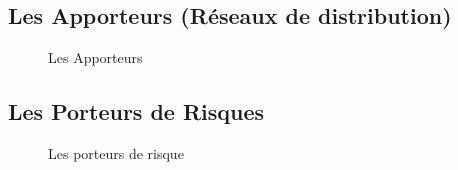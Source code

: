     \subsection{Les Apporteurs (Réseaux de distribution)}
    \begin{figure}[H]
\centering
{}
\caption{Les Apporteurs}
\label{fig:Mod-Enseig}
\end{figure}
       

    \subsection{Les Porteurs de Risques}
          \begin{figure}[H]
\centering
{}
\caption{Les porteurs de risque}
\label{fig:Mod-Enseig}
\end{figure}

